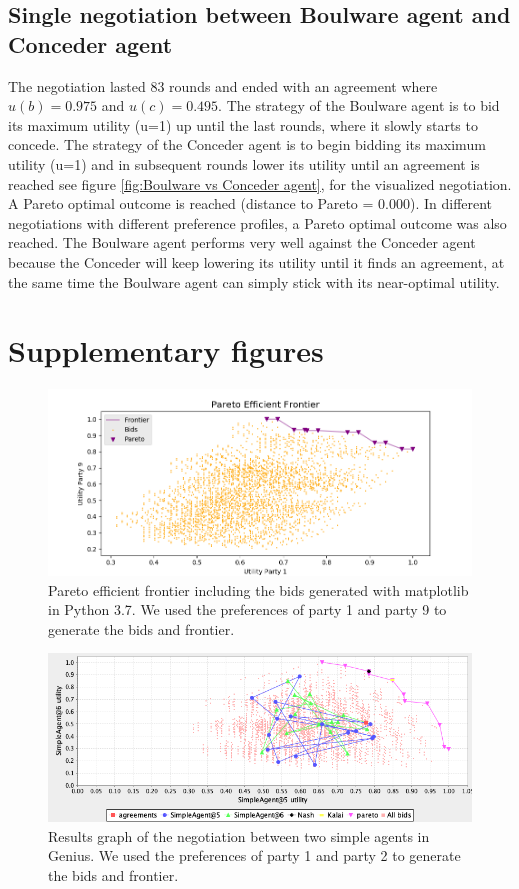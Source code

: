 \documentclass[a4paper]{article}
\begin{document}
\subsection{Single negotiation between Boulware agent and Conceder agent}
The negotiation lasted 83 rounds and ended with an agreement where $u(b) = 0.975$ and $u(c) = 0.495$. The strategy of the Boulware agent is to bid its maximum utility (u=1) up until the last rounds, where it slowly starts to concede. The strategy of the Conceder agent is to begin bidding its maximum utility (u=1) and in subsequent rounds lower its utility until an agreement is reached see figure \ref{fig:Boulware vs Conceder agent}, for the visualized negotiation. A Pareto optimal outcome is reached (distance to Pareto = 0.000). In different negotiations with different preference profiles, a Pareto optimal outcome was also reached. The Boulware agent performs very well against the Conceder agent because the Conceder will keep lowering its utility until it finds an agreement, at the same time the Boulware agent can simply stick with its near-optimal utility. 

\newpage
\section{Supplementary figures}
\begin{figure}[h!]
\centering
\includegraphics[width=125mm]{pareto_efficient.png}
\caption{Pareto efficient frontier including the bids generated with matplotlib in Python 3.7. We used the preferences of party 1 and party 9 to generate the bids and frontier.}
\label{fig:Pareto efficient figure}
\end{figure}

\begin{figure}[h!]
\centering
\includegraphics[width=125mm]{simplevssimple.png}
\caption{Results graph of the negotiation between two simple agents in Genius. We used the preferences of party 1 and party 2 to generate the bids and frontier.}
\label{fig:Simple vs simple agents}
\end{figure}
\end{document}
